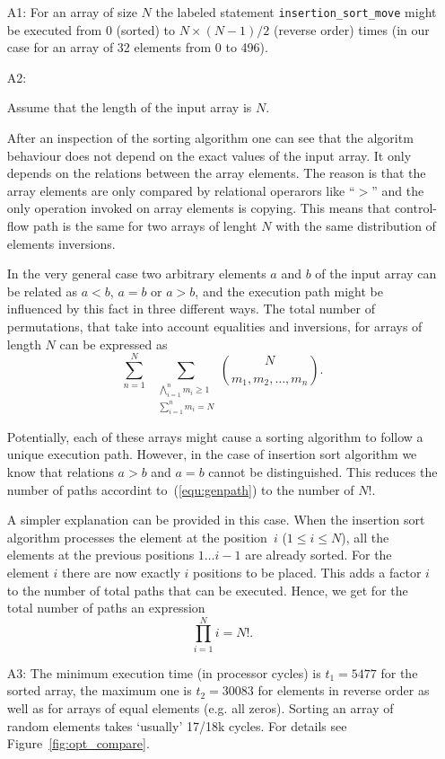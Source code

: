 \documentclass[12pt,a4paper,titlepage,oneside]{article}
\begin{document}
\begin{itemize}
\item[A1:]
For an array of size $N$ the labeled statement
\texttt{insertion\_sort\_move} might be executed from $0$ (sorted) to
$N\times(N-1)/2$ (reverse order) times (in our case for an array of 32 
elements from 0 to 496). 

\item[A2:] 

  Assume that the length of the input array is $N$.

  After an inspection of the sorting algorithm one can see that the
  algoritm behaviour does not depend on the exact values of the input
  array.
  It only depends on the relations between the array elements.
  The reason is that the array elements are only compared by
  relational operarors like ``$>$'' and the only operation invoked on
  array elements is copying.
  This means that control-flow path is the same for two arrays of
  lenght $N$ with the same distribution of elements inversions.

  In the very general case two arbitrary elements $a$ and $b$ of the
  input array can be related as $a<b$, $a=b$ or $a>b$, and the
  execution path might be influenced by this fact in three different
  ways.
  The total number of permutations, that take into account equalities
  and inversions, for arrays of length $N$ can be expressed as
  \begin{equation}
	\sum_{n=1}^N \ \ \sum_{\substack{
	  \bigwedge_{i=1}^n m_i \geq 1 
	  \\ \sum_{i=1}^n m_i = N}} \binom N {m_1, m_2, \ldots, m_n}.
	  \label{equ:genpath}
  \end{equation}

Potentially, each of these arrays might cause a sorting algorithm
to follow a unique execution path.
However, in the case of insertion sort algorithm we know that
relations $a>b$ and $a=b$ cannot be distinguished.
This reduces the number of paths accordint to~(\ref{equ:genpath})
to the number of $N!$.

A simpler explanation can be provided in this case.
When the insertion sort algorithm processes the element at the
position~$i$ ($1 \leq i \leq N$), all the elements at the previous
positions $1\ldots i-1$ are already sorted.
For the element $i$ there are now exactly $i$ positions to be
placed.
This adds a factor $i$ to the number of total paths that can be
executed.
Hence, we get for the total number of paths an expression
\begin{equation}
  \prod_{i=1}^N i = N!.
\end{equation}

           
\item[A3:] 
The minimum execution time (in processor cycles) is $t_1 = 5477$
for the sorted array, the maximum one is $t_2 = 30083$ for elements in
reverse order as well as for arrays of equal elements (e.g. all
zeros). Sorting an array of random elements takes `usually' 17/18k cycles.
For details see Figure~\ref{fig:opt_compare}.

\end{itemize}
\end{document}
